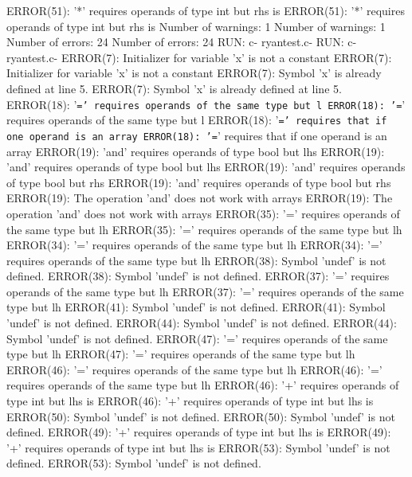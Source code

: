 \documentclass[12pt]{book}
\begin{document}
ERROR(51): '*' requires operands of type int but rhs is         ERROR(51): '*' requires operands of type int but rhs is 
Number of warnings: 1                                                Number of warnings: 1
Number of errors: 24                                                Number of errors: 24
RUN: c- ryantest.c-                                                RUN: c- ryantest.c-
ERROR(7): Initializer for variable 'x' is not a constant        ERROR(7): Initializer for variable 'x' is not a constant
ERROR(7): Symbol 'x' is already defined at line 5.                ERROR(7): Symbol 'x' is already defined at line 5.
ERROR(18): '\texttt{=' requires operands of the same type but l	ERROR(18): '=}' requires operands of the same type but l
ERROR(18): '\texttt{=' requires that if one operand is an array	ERROR(18): '=}' requires that if one operand is an array
ERROR(19): 'and' requires operands of type bool but lhs         ERROR(19): 'and' requires operands of type bool but lhs 
ERROR(19): 'and' requires operands of type bool but rhs         ERROR(19): 'and' requires operands of type bool but rhs 
ERROR(19): The operation 'and' does not work with arrays        ERROR(19): The operation 'and' does not work with arrays
ERROR(35): '=' requires operands of the same type but lh        ERROR(35): '=' requires operands of the same type but lh
ERROR(34): '=' requires operands of the same type but lh        ERROR(34): '=' requires operands of the same type but lh
ERROR(38): Symbol 'undef' is not defined.                        ERROR(38): Symbol 'undef' is not defined.
ERROR(37): '=' requires operands of the same type but lh        ERROR(37): '=' requires operands of the same type but lh
ERROR(41): Symbol 'undef' is not defined.                        ERROR(41): Symbol 'undef' is not defined.
ERROR(44): Symbol 'undef' is not defined.                        ERROR(44): Symbol 'undef' is not defined.
ERROR(47): '=' requires operands of the same type but lh        ERROR(47): '=' requires operands of the same type but lh
ERROR(46): '=' requires operands of the same type but lh        ERROR(46): '=' requires operands of the same type but lh
ERROR(46): '+' requires operands of type int but lhs is         ERROR(46): '+' requires operands of type int but lhs is 
ERROR(50): Symbol 'undef' is not defined.                        ERROR(50): Symbol 'undef' is not defined.
ERROR(49): '+' requires operands of type int but lhs is         ERROR(49): '+' requires operands of type int but lhs is 
ERROR(53): Symbol 'undef' is not defined.                        ERROR(53): Symbol 'undef' is not defined.
\end{document}
